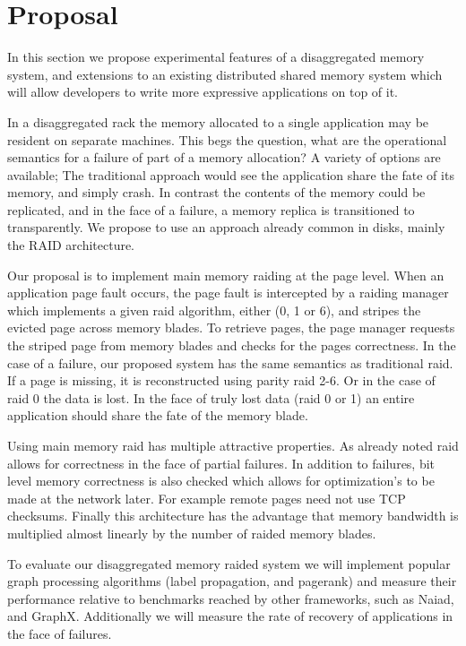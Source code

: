 \section{Proposal}

In this section we propose experimental features of a disaggregated
memory system, and extensions to an existing distributed shared memory
system which will allow developers to write more expressive
applications on top of it.


 In a disaggregated
rack the memory allocated to a single application may be resident on
separate machines. This begs the question, what are the operational
semantics for a failure of part of a memory allocation? A variety of
options are available; The traditional approach would see the
application share the fate of its memory, and simply crash. In
contrast the contents of the memory could be replicated, and in the
face of a failure, a memory replica is transitioned to transparently.
We propose to use an approach already common in disks, mainly the RAID
architecture. 

Our proposal is to implement main memory raiding at the page level.
When an application page fault occurs, the page fault is intercepted
by a raiding manager which implements a given raid algorithm, either
(0, 1 or 6), and stripes the evicted page across memory blades. To
retrieve pages, the page manager requests the striped page from memory
blades and checks for the pages correctness. In the case of a failure,
our proposed system has the same semantics as traditional raid. If a
page is missing, it is reconstructed using parity raid 2-6. Or in the
case of raid 0 the data is lost. In the face of truly lost data (raid
0 or 1) an entire application should share the fate of the memory
blade.

Using main memory raid has multiple attractive properties. As already
noted raid allows for correctness in the face of partial failures. In
addition to failures, bit level memory correctness is also checked
which allows for optimization's to be made at the network later. For
example remote pages need not use TCP checksums. Finally this
architecture has the advantage that memory bandwidth is multiplied
almost linearly by the number of raided memory blades.

To evaluate our disaggregated memory raided system we will implement
popular graph processing algorithms (label propagation, and pagerank)
and measure their performance relative to benchmarks reached by other
frameworks, such as Naiad, and GraphX. Additionally we will measure
the rate of recovery of applications in the face of failures. 


